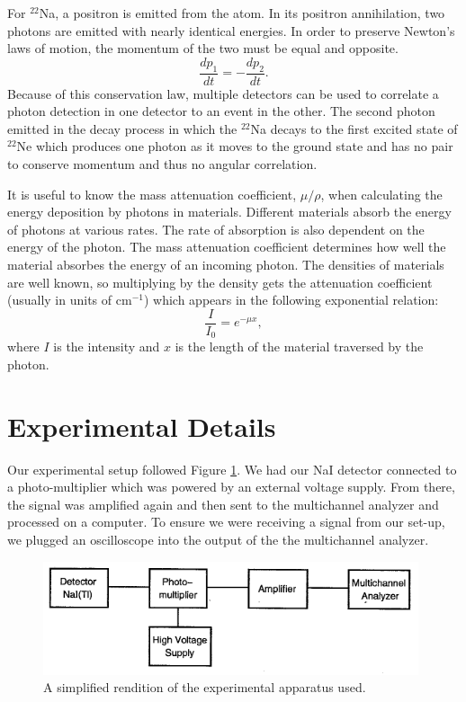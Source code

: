 \documentclass[10pt]{IEEEtran}
\begin{document}
For $^{22}$Na, a positron is emitted from the atom. In its positron annihilation, two photons are emitted with nearly identical energies. In order to preserve Newton's laws of motion, the momentum of the two must be equal and opposite.
	\begin{equation}
		\frac{dp_1}{dt} = -\frac{dp_2}{dt}.	
	\end{equation}
Because of this conservation law, multiple detectors can be used to correlate a photon detection in one detector to an event in the other. The second photon emitted in the decay process in which the $^{22}$Na decays to the first excited state of $^{22}$Ne which produces one photon as it moves to the ground state and has no pair to conserve momentum and thus no angular correlation\cite{columbia}.

It is useful to know the mass attenuation coefficient, $\mu/\rho$, when calculating the energy deposition by photons in materials. Different materials absorb the energy of photons at various rates. The rate of absorption is also dependent on the energy of the photon. The mass attenuation coefficient determines how well the material absorbes the energy of an incoming photon. The densities of materials are well known\cite{density}, so multiplying by the density gets the attenuation coefficient (usually in units of cm$^{-1}$) which appears in the following exponential relation:
	\begin{equation}
		\frac{I}{I_0} = e^{-\mu x},
	\end{equation}
where $I$ is the intensity and $x$ is the length of the material traversed by the photon\cite{nucleons}.
\section{Experimental Details}
Our experimental setup followed Figure \ref{fig:setup}. We had our NaI detector connected to a photo-multiplier which was powered by an external voltage supply. From there, the signal was amplified again and then sent to the multichannel analyzer and processed on a computer. To ensure we were receiving a signal from our set-up, we plugged an oscilloscope into the output of the the multichannel analyzer.
    \begin{figure}[!hbt]
        \begin{center}
        \includegraphics[width=\columnwidth]{setup}
        \caption{A simplified rendition of the experimental apparatus used\cite{nucleons}.}        
        \label{fig:setup}
        \end{center}
    \end{figure}
\end{document}

